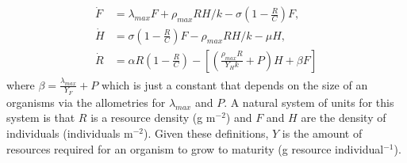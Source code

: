 \documentclass{pnastwo}
\begin{document}
\begin{article}
\begin{align} 
\begin{split}
\dot{F} &= \lambda_{max} F + \rho_{max}RH/k - \sigma \left(1-\frac{R}{C}\right)F,  \\
\dot{H} &= \sigma \left(1-\frac{R}{C}\right)F - \rho_{max}R H/k - \mu H,  \\
\dot{R} &= \alpha R\left(1-\frac{R}{C}\right) -\left[\left(\frac{\rho_{max}R}{Y_{H}k}+P\right)H+\beta F\right]
\end{split}
\end{align}
where $\beta=\frac{\lambda_{max}}{Y_{F}}+P$ which is just a constant that depends on the size of an organisms via the allometries for $\lambda_{max}$ and $P$. A natural system of units for this system is that $R$ is a resource density (g m$^{-2}$) and $F$ and $H$ are the density of individuals (individuals m$^{-2}$). Given these definitions, $Y$ is the amount of resources required for an organism to grow to maturity (g resource individual$^{-1}$). 


\end{article}
\end{document}
